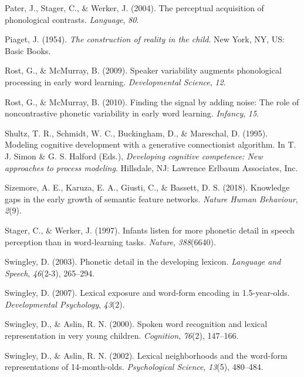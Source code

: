 \documentclass[english,,man]{apa6}
\begin{document}
\leavevmode\hypertarget{ref-pater2004}{}%
Pater, J., Stager, C., \& Werker, J. (2004). The perceptual acquisition of phonological contrasts. \emph{Language}, \emph{80}.

\leavevmode\hypertarget{ref-piaget1954}{}%
Piaget, J. (1954). \emph{The construction of reality in the child}. New York, NY, US: Basic Books.

\leavevmode\hypertarget{ref-rost2009}{}%
Rost, G., \& McMurray, B. (2009). Speaker variability augments phonological processing in early word learning. \emph{Developmental Science}, \emph{12}.

\leavevmode\hypertarget{ref-rost2010}{}%
Rost, G., \& McMurray, B. (2010). Finding the signal by adding noise: The role of noncontrastive phonetic variability in early word learning. \emph{Infancy}, \emph{15}.

\leavevmode\hypertarget{ref-shultz1995}{}%
Shultz, T. R., Schmidt, W. C., Buckingham, D., \& Mareschal, D. (1995). Modeling cognitive development with a generative connectionist algorithm. In T. J. Simon \& G. S. Halford (Eds.), \emph{Developing cognitive competence: New approaches to process modeling}. Hillsdale, NJ: Lawrence Erlbaum Associates, Inc.

\leavevmode\hypertarget{ref-sizemore2018}{}%
Sizemore, A. E., Karuza, E. A., Giusti, C., \& Bassett, D. S. (2018). Knowledge gaps in the early growth of semantic feature networks. \emph{Nature Human Behaviour}, \emph{2}(9).

\leavevmode\hypertarget{ref-stager1997}{}%
Stager, C., \& Werker, J. (1997). Infants listen for more phonetic detail in speech perception than in word-learning tasks. \emph{Nature}, \emph{388}(6640).

\leavevmode\hypertarget{ref-swingley2003}{}%
Swingley, D. (2003). Phonetic detail in the developing lexicon. \emph{Language and Speech}, \emph{46}(2-3), 265--294.

\leavevmode\hypertarget{ref-swingley2007}{}%
Swingley, D. (2007). Lexical exposure and word-form encoding in 1.5-year-olds. \emph{Developmental Psychology}, \emph{43}(2).

\leavevmode\hypertarget{ref-swingley2000}{}%
Swingley, D., \& Aslin, R. N. (2000). Spoken word recognition and lexical representation in very young children. \emph{Cognition}, \emph{76}(2), 147--166.

\leavevmode\hypertarget{ref-swingley2002}{}%
Swingley, D., \& Aslin, R. N. (2002). Lexical neighborhoods and the word-form representations of 14-month-olds. \emph{Psychological Science}, \emph{13}(5), 480--484.
\end{document}
